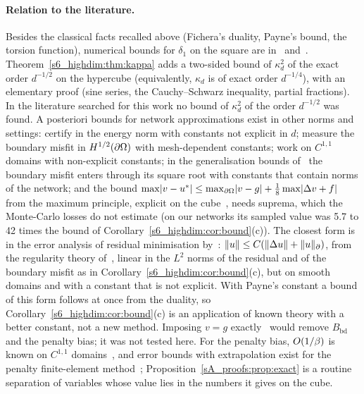 \paragraph{Relation to the literature.} Besides the classical facts recalled above (Fichera's
duality, Payne's bound, the torsion function), numerical bounds for $\delta_1$ on the square are
in~\citet{kuttler1972remarks} and~\citet{ferrero2005fourth}. Theorem~\ref{s6_highdim:thm:kappa}
adds a two-sided bound of $\kappa_d^2$ of the exact order $d^{-1/2}$ on the hypercube
(equivalently, $\kappa_d$ is of exact order $d^{-1/4}$), with an elementary proof (sine series,
the Cauchy--Schwarz inequality, partial fractions). In the literature searched for this work no
bound of $\kappa_d^2$ of the order $d^{-1/2}$ was found.
A posteriori bounds for network approximations exist in other norms and settings:
\citet{ernst2025certification} certify in the energy norm with constants not explicit in $d$;
\citet{fuhrer2025aposteriori} measure the boundary misfit in $H^{1/2}(\partial\Omega)$ with mesh-dependent
constants; \citet{zeinhofer2025unified} work on $C^{1,1}$ domains with non-explicit constants;
in the generalisation bounds of~\citet{mishra2023generalization} the boundary misfit enters through
its square root with constants that contain norms of the network; and the bound
$\max\lvert v-u^{*}\rvert\le\max_{\partial\Omega}\lvert v-g\rvert+\frac18\max\lvert \Delta v+f\rvert$ from the maximum principle,
explicit on the cube~\citep[Prop.~7]{mukherjee2026certification}, needs suprema, which the
Monte-Carlo losses do not estimate (on our networks its sampled value was 5.7 to 42 times the
bound of Corollary~\ref{s6_highdim:cor:bound}(c)). The closest form is in the error analysis of
residual minimisation by~\citet[App.~B, eq.~(B2)]{shin2023error}: $\lVert u\rVert\le C(\lVert \Delta
u\rVert+\lVert u\rVert_{\partial})$, from the regularity theory of~\citet{bramble1970rayleigh}, linear in the $L^2$ norms
of the residual and of the boundary misfit as in Corollary~\ref{s6_highdim:cor:bound}(c), but on
smooth domains and with a constant that is not explicit. With Payne's constant a bound of this
form follows at once from the duality, so Corollary~\ref{s6_highdim:cor:bound}(c) is an application
of known theory with a better constant, not a new method. Imposing $v=g$
exactly~\citep{sukumar2022exact} would remove $B_{\mathrm{bd}}$ and the penalty bias; it was not
tested here. For the penalty bias, $O(1/\beta)$ is known on $C^{1,1}$ domains~\citep{muller2022},
and error bounds with extrapolation exist for the penalty finite-element
method~\citep{king1974penalty}; Proposition~\ref{sA_proofs:prop:exact} is a routine separation of
variables whose value lies in the numbers it gives on the cube.

